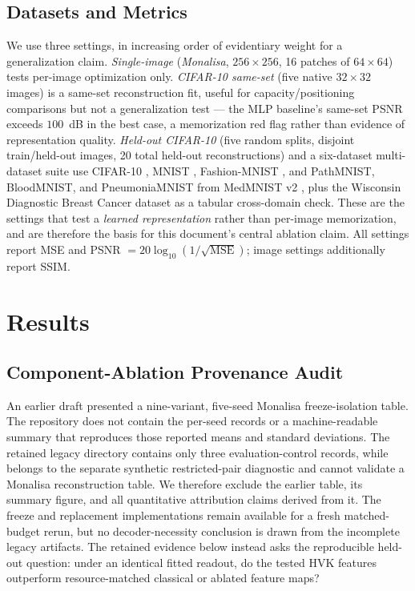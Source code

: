 \documentclass[11pt]{article}
\begin{document}
\subsection{Datasets and Metrics}
We use three settings, in increasing order of evidentiary weight for a generalization claim. \textit{Single-image} (\textit{Monalisa}, $256\times256$, 16 patches of $64\times64$) tests per-image optimization only. \textit{CIFAR-10 same-set} (five native $32\times32$ images) is a same-set reconstruction fit, useful for capacity/positioning comparisons but not a generalization test --- the MLP baseline's same-set PSNR exceeds $100$~dB in the best case, a memorization red flag rather than evidence of representation quality. \textit{Held-out CIFAR-10} (five random splits, disjoint train/held-out images, 20 total held-out reconstructions) and a six-dataset multi-dataset suite use CIFAR-10 \cite{Krizhevsky2009}, MNIST \cite{LeCun1998}, Fashion-MNIST \cite{Xiao2017}, and PathMNIST, BloodMNIST, and PneumoniaMNIST from MedMNIST v2 \cite{Yang2023}, plus the Wisconsin Diagnostic Breast Cancer dataset \cite{Wolberg1993} as a tabular cross-domain check. These are the settings that test a \emph{learned representation} rather than per-image memorization, and are therefore the basis for this document's central ablation claim. All settings report MSE and PSNR $=20\log_{10}(1/\sqrt{\mathrm{MSE}})$; image settings additionally report SSIM.

\section{Results}
\label{sec:results}

\subsection{Component-Ablation Provenance Audit}
\label{sec:component_provenance}
\begin{sloppypar}
An earlier draft presented a nine-variant, five-seed Monalisa freeze-isolation table. The repository does not contain the per-seed records or a machine-readable summary that reproduces those reported means and standard deviations. The retained legacy directory contains only three evaluation-control records, while  belongs to the separate synthetic restricted-pair diagnostic and cannot validate a Monalisa reconstruction table. We therefore exclude the earlier table, its summary figure, and all quantitative attribution claims derived from it. The freeze and replacement implementations remain available for a fresh matched-budget rerun, but no decoder-necessity conclusion is drawn from the incomplete legacy artifacts. The retained evidence below instead asks the reproducible held-out question: under an identical fitted readout, do the tested HVK features outperform resource-matched classical or ablated feature maps?
\end{sloppypar}
\end{document}
